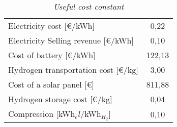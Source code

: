 \begin{table}[hb!]
\centering
\begin{tabular}{|lc|}
\hline
\rowcolor{bluepoli!40}\multicolumn{2}{|c|}{\textbf{Constant}}                             \\ \hline
\multicolumn{1}{|l|}{Electricity cost {[}€/kWh{]}}              & 0,22                    \\ \hline
\multicolumn{1}{|l|}{Electricity Selling revenue {[}€/kWh{]}}   & 0,10                    \\ \hline
\multicolumn{1}{|l|}{Cost of battery {[}€/kWh{]}}               & 122,13                  \\ \hline
\multicolumn{1}{|l|}{Hydrogen transportation cost {[}€/kg{]}}   & 3,00                    \\ \hline
\multicolumn{1}{|l|}{Cost of a solar panel {[}€{]}}         & 811,88                \\ \hline
\multicolumn{1}{|l|}{Hydrogen storage cost {[}€/kg{]}}          & 0,04                    \\ \hline
\multicolumn{1}{|l|}{Compression {[}kWh$_el$/kWh$_{H_2}${]}}    & 0,10                    \\ \hline
\end{tabular}
\caption{\textit{Useful cost constant\textsuperscript{\cite{ARERA2020,enelx, pianoidrogeno}}}}
\label{tab:costconstant}
\end{table}
